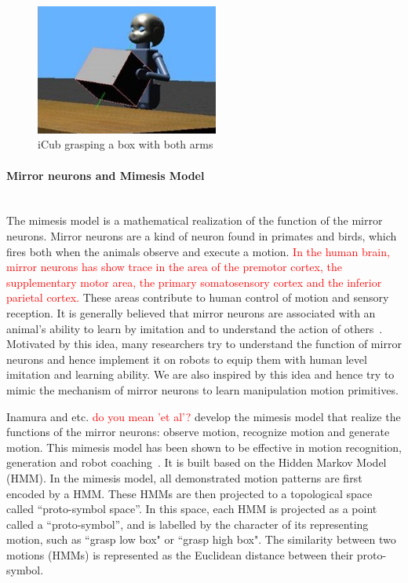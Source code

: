 \begin{figure}
  \centering
  \includegraphics[width=6cm]{./fig_cha5/begin.jpg}
  \caption{ \scriptsize{iCub grasping a box with both arms}
}
    \label{begin}
    \vspace{-0.5cm}
\end{figure}



\paragraph{Mirror neurons and Mimesis Model} ~\\
The mimesis model is a mathematical realization of the function of the mirror neurons. Mirror neurons are a kind of neuron found in primates and birds, which fires both when the animals observe and execute a motion. \textcolor{red}{In the human brain, mirror neurons has show trace
in the area of the premotor cortex, the supplementary motor area, the primary somatosensory cortex and the inferior parietal cortex.} These areas contribute to human control of motion and sensory reception. It is generally believed that mirror neurons are associated with an animal's ability to learn by imitation and to understand the action of others~\citep{rizzolatti2004mirror}. Motivated by this idea, many researchers try to understand the function of mirror neurons and hence implement it on robots to equip them with human level imitation and learning ability. We are also inspired by this idea and hence try to mimic the mechanism of mirror neurons to learn manipulation motion primitives.

Inamura and etc. \textcolor{red}{do you mean 'et al'?} develop the mimesis model that realize the functions of the mirror neurons: observe motion, recognize motion and generate motion.
This mimesis model has been shown to be effective in motion recognition, generation and robot coaching~\citep{inamura2008geometric,okuno2011motion}. It is built based on the Hidden Markov Model (HMM).
In the mimesis model, all demonstrated motion patterns are first encoded by a HMM. These HMMs are then projected to a topological space called ``proto-symbol space''. In this space, each HMM is projected as a point called a ``proto-symbol'', and is labelled by the character of its representing motion, such as ``grasp low box" or ``grasp high box". The similarity between two motions (HMMs) is represented as the Euclidean distance between their proto-symbol.

